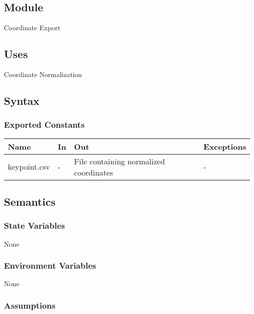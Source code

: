 \documentclass[12pt, titlepage]{article}
\begin{document}
\subsection{Module}

Coordinate Export\\

\subsection{Uses}

Coordinate Normalization\\

\subsection{Syntax}

\subsubsection{Exported Constants}

\begin{center}
\begin{tabular}{p{2cm} p{4cm} p{4cm} p{2cm}}
\hline
\textbf{Name} & \textbf{In} & \textbf{Out} & \textbf{Exceptions} \\
\hline
keypoint.csv & - & File containing normalized coordinates & - \\
\hline
\end{tabular}
\end{center}

\subsection{Semantics}

\subsubsection{State Variables}

None\\

\subsubsection{Environment Variables}

None\\

\subsubsection{Assumptions}
\end{document}
